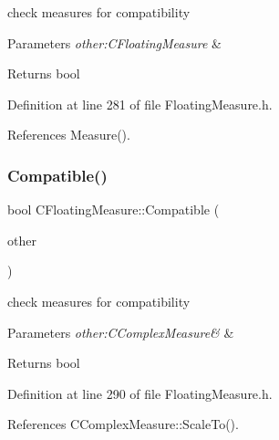 check measures for compatibility 


\begin{DoxyParams}{Parameters}
{\em other\+:\+C\+Floating\+Measure} & \\
\hline
\end{DoxyParams}
\begin{DoxyReturn}{Returns}
bool 
\end{DoxyReturn}


Definition at line 281 of file Floating\+Measure.\+h.



References Measure().

\mbox{\label{classCFloatingMeasure_a5cf69c287abe4e2f65242e97093f7595}} 
\subsubsection{\texorpdfstring{Compatible()}{Compatible()}\hspace{0.1cm}{\footnotesize\ttfamily [2/2]}}
{\footnotesize\ttfamily bool C\+Floating\+Measure\+::\+Compatible (\begin{DoxyParamCaption}\item[{const \hyperlink{classCComplexMeasure}{C\+Complex\+Measure} \&}]{other }\end{DoxyParamCaption})\hspace{0.3cm}{\ttfamily [inline]}}



check measures for compatibility 


\begin{DoxyParams}{Parameters}
{\em other\+:\+C\+Complex\+Measure\&} & \\
\hline
\end{DoxyParams}
\begin{DoxyReturn}{Returns}
bool 
\end{DoxyReturn}


Definition at line 290 of file Floating\+Measure.\+h.



References C\+Complex\+Measure\+::\+Scale\+To().

\mbox{\label{classCFloatingMeasure_a6d92f39204f23e81732cb77131517b6f}} 
